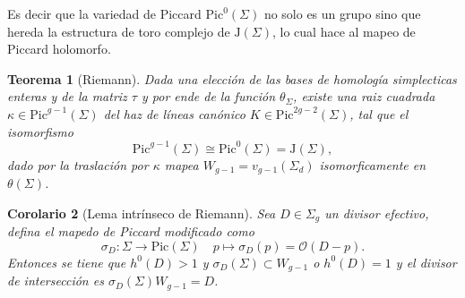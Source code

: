 \documentclass[letterpaper]{article}
\newtheorem{teorema}{Teorema}[section]
\newtheorem{cor}[teorema]{Corolario}
\newcommand{\sig}{\ensuremath{\Sigma}}
\newcommand{\lnb}{\ensuremath{\mathcal{O}}}
\newcommand{\jac}{\ensuremath{\mathrm{J}(\sig)}}
\begin{document}
\noindent Es decir que la variedad de Piccard \(\mathrm{Pic}^{0}(\sig)\) no solo es un grupo sino que hereda la estructura de toro complejo de \(\jac\), lo cual hace al mapeo de Piccard holomorfo.
\begin{teorema}[Riemann]
  Dada una elección de las bases de homología simplecticas enteras y de la matriz \(\tau\) y por ende de la función \(\theta_{\sig}\), existe una raiz cuadrada \(\kappa\in\mathrm{Pic}^{g-1}(\sig)\) del haz de líneas canónico \(K\in\mathrm{Pic}^{2g-2}(\sig)\), tal que el isomorfismo
  \[
    \mathrm{Pic}^{g-1}(\sig)\cong\mathrm{Pic}^{0}(\sig)=\jac,
  \]
  dado por la traslación por \(\kappa\) mapea \(W_{g-1}=v_{g-1}(\sig_{d})\) isomorficamente en \(\theta(\sig)\).
\end{teorema}
\begin{cor}[Lema intrínseco de Riemann]
  Sea \(D\in\sig_{g}\) un divisor efectivo, defina el mapedo de Piccard modificado como
  \[
    \sigma_{D}:\sig\to\mathrm{Pic}(\sig)\quad p\mapsto\sigma_{D}(p)=\lnb(D-p).
  \]
  Entonces se tiene que \(h^{0}(D)>1\) y \(\sigma_{D}(\sig)\subset W_{g-1}\) o \(h^{0}(D)=1\) y el divisor de intersección es \(\sigma_{D}(\sig) W_{g-1}=D\).
  \end{cor}
\end{document}
